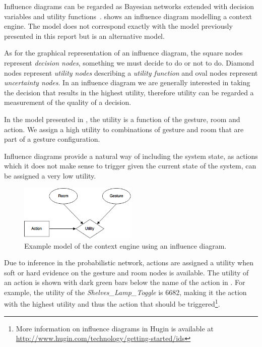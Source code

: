 Influence diagrams can be regarded as Bayesian networks extended with decision variables and utility functions~\cite{kjaerulff2008bayesian}.  shows an influence diagram modelling a context engine. The model does not correspond exactly with the model previously presented in this report but is an alternative model.

As for the graphical representation of an influence diagram, the square nodes represent \emph{decision nodes}, \ie something we must decide to do or not to do. Diamond nodes represent \emph{utility nodes} describing a \emph{utility function} and oval nodes represent \emph{uncertainty nodes}. In an influence diagram we are generally interested in taking the decision that results in the highest utility, therefore utility can be regarded a measurement of the quality of a decision.

In the model presented in , the utility is a function of the gesture, room and action. We assign a high utility to combinations of gesture and room that are part of a gesture configuration. 

Influence diagrams provide a natural way of including the system state, as actions which it does not make sense to trigger given the current state of the system, can be assigned a very low utility.

\begin{figure}[!h]
\centering
\includegraphics[width=0.50\textwidth]{images/influence-diagram}
\caption{Example model of the context engine using an influence diagram.}
\label{fig:evaluation:alternative-models:influence-diagram}
\end{figure}

Due to inference in the probabilistic network, actions are assigned a utility when soft or hard evidence on the gesture and room nodes is available. The utility of an action is shown with dark green bars below the name of the action in . For example, the utility of the \emph{Shelves\_Lamp\_Toggle} is 6682, making it the action with the highest utility and thus the action that should be triggered\footnote{More information on influence diagrams in Hugin is available at \url{http://www.hugin.com/technology/getting-started/ids}}.

